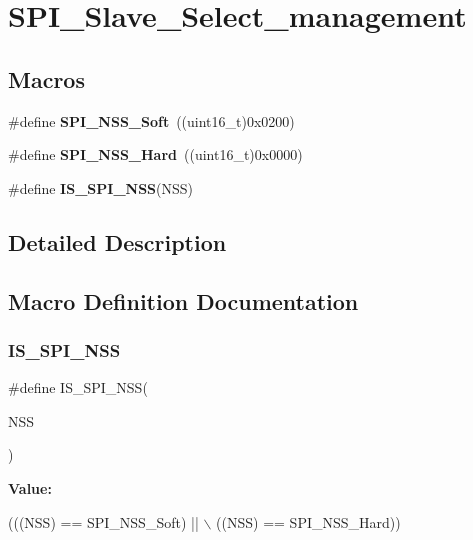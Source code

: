 \section{S\+P\+I\+\_\+\+Slave\+\_\+\+Select\+\_\+management}
\label{group__SPI__Slave__Select__management}
\subsection*{Macros}
\begin{DoxyCompactItemize}
\item 
\#define \textbf{ S\+P\+I\+\_\+\+N\+S\+S\+\_\+\+Soft}~((uint16\+\_\+t)0x0200)
\item 
\#define \textbf{ S\+P\+I\+\_\+\+N\+S\+S\+\_\+\+Hard}~((uint16\+\_\+t)0x0000)
\item 
\#define \textbf{ I\+S\+\_\+\+S\+P\+I\+\_\+\+N\+SS}(N\+SS)
\end{DoxyCompactItemize}


\subsection{Detailed Description}


\subsection{Macro Definition Documentation}
\mbox{\label{group__SPI__Slave__Select__management_gabbeedf42eccef1bae4f88c606fc3b261}} 
\subsubsection{I\+S\+\_\+\+S\+P\+I\+\_\+\+N\+SS}
{\footnotesize\ttfamily \#define I\+S\+\_\+\+S\+P\+I\+\_\+\+N\+SS(\begin{DoxyParamCaption}\item[{}]{N\+SS }\end{DoxyParamCaption})}

{\bfseries Value\+:}
\begin{DoxyCode}
(((NSS) == SPI_NSS_Soft) || \(\backslash\)
                         ((NSS) == SPI_NSS_Hard))
\end{DoxyCode}


